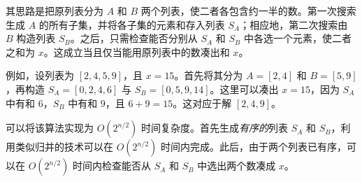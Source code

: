 其思路是把原列表分为 $A$ 和 $B$ 两个列表，使二者各包含约一半的数。第一次搜索生成 $A$ 的所有子集，并将各子集的元素和存入列表 $S_A$；相应地，第二次搜索由 $B$ 构造列表 $S_B$。之后，只需检查能否分别从 $S_A$ 和 $S_B$ 中各选一个元素，使二者之和为 $x$。这成立当且仅当能用原列表中的数凑出和 $x$。

例如，设列表为 $[2,4,5,9]$，且 $x=15$。首先将其分为 $A=[2,4]$ 和 $B=[5,9]$，再构造 $S_A=[0,2,4,6]$ 与 $S_B=[0,5,9,14]$。这里可以凑出 $x=15$，因为 $S_A$ 中有和 $6$，$S_B$ 中有和 $9$，且 $6+9=15$。这对应于解 $[2,4,9]$。

可以将该算法实现为 $O(2^{n/2})$ 时间复杂度。首先生成\emph{有序的}列表 $S_A$ 和 $S_B$，利用类似归并的技术可以在 $O(2^{n/2})$ 时间内完成。此后，由于两个列表已有序，可以在 $O(2^{n/2})$ 时间内检查能否从 $S_A$ 和 $S_B$ 中选出两个数凑成 $x$。
